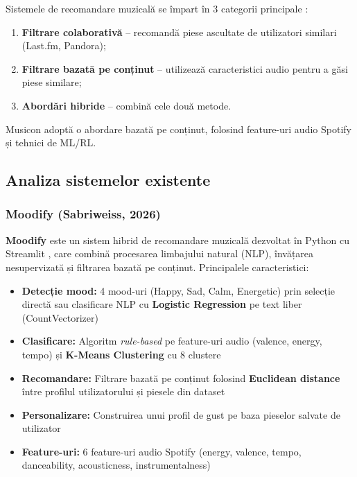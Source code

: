 \documentclass[12pt,a4paper]{article}
\begin{document}
Sistemele de recomandare muzicală se împart în 3 categorii principale \cite{aggarwal2016}:
\begin{enumerate}
    \item \textbf{Filtrare colaborativă} -- recomandă piese ascultate de utilizatori similari (Last.fm, Pandora);
    \item \textbf{Filtrare bazată pe conținut} -- utilizează caracteristici audio pentru a găsi piese similare;
    \item \textbf{Abordări hibride} -- combină cele două metode.
\end{enumerate}

Musicon adoptă o abordare bazată pe conținut, folosind feature-uri audio Spotify și tehnici de ML/RL.

\subsection{Analiza sistemelor existente}

\subsubsection{Moodify (Sabriweiss, 2026)}

\textbf{Moodify} \cite{moodify2026} este un sistem hibrid de recomandare muzicală dezvoltat în Python cu Streamlit \cite{streamlit}, care combină procesarea limbajului natural (NLP), învățarea nesupervizată și filtrarea bazată pe conținut. Principalele caracteristici:

\begin{itemize}
    \item \textbf{Detecție mood:} 4 mood-uri (Happy, Sad, Calm, Energetic) prin selecție directă sau clasificare NLP cu \textbf{Logistic Regression} pe text liber (CountVectorizer)
    \item \textbf{Clasificare:} Algoritm \textit{rule-based} pe feature-uri audio (valence, energy, tempo) și \textbf{K-Means Clustering} cu 8 clustere
    \item \textbf{Recomandare:} Filtrare bazată pe conținut folosind \textbf{Euclidean distance} între profilul utilizatorului și piesele din dataset
    \item \textbf{Personalizare:} Construirea unui profil de gust pe baza pieselor salvate de utilizator
    \item \textbf{Feature-uri:} 6 feature-uri audio Spotify (energy, valence, tempo, danceability, acousticness, instrumentalness)
\end{itemize}
\end{document}

